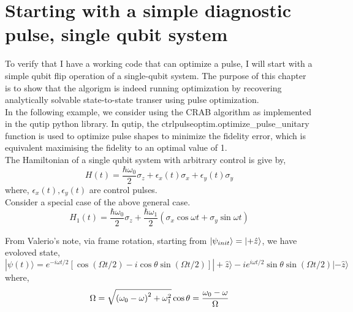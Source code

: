 \documentclass[12pt]{report}
\begin{document}
\section{Starting with a simple diagnostic pulse, single qubit system}
To verify that I have a working code that can optimize a pulse, 
I will start with a simple qubit flip operation of a single-qubit system.
The purpose of this chapter is to show that the algorigm is indeed running optimization
by recovering analytically solvable state-to-state transer using pulse optimization. 
\\
In the following example, we consider using the CRAB algorithm as implemented in the 
qutip python library. In qutip, the ctrlpulseoptim.optimize\_pulse\_unitary function is used 
to optimize pulse shapes to minimize the fidelity error, which is equivalent maximising the fidelity to an optimal value of 1.
\\
The Hamiltonian of a single qubit system with arbitrary control is give by, 
\begin{equation}
    H(t) = \frac{\hbar \omega_0}{2} \sigma_z + \epsilon_x(t)\sigma_x + \epsilon_y(t)\sigma_y 
\end{equation}
where, $\epsilon_x(t), \epsilon_y(t)$ are control pulses.  
\\
Consider a special case of the above general case. 
\begin{equation}
    H_1(t) = \frac{\hbar \omega_0}{2} \sigma_z + \frac{\hbar \omega_1}{2}(\sigma_x\cos{\omega t} + \sigma_y\sin{\omega t})    
\end{equation}

From Valerio's note, via frame rotation, starting from $\ket{\psi_{init}} = \ket{+\hat{z}}$, 
we have evoloved state, 
\begin{equation}
    |\psi(t)\rangle=e^{-i \omega t / 2}[\cos (\Omega t / 2)-i \cos \theta \sin (\Omega t / 2)]|+\hat{z}\rangle-i e^{i \omega t / 2} \sin \theta \sin (\Omega t / 2)|-\hat{z}\rangle
\end{equation}
where, 
$$
\Omega=\sqrt{\left(\omega_0-\omega\right)^2+\omega_1^2} \\
\cos \theta=\frac{\omega_0-\omega}{\Omega}
$$
\end{document}
